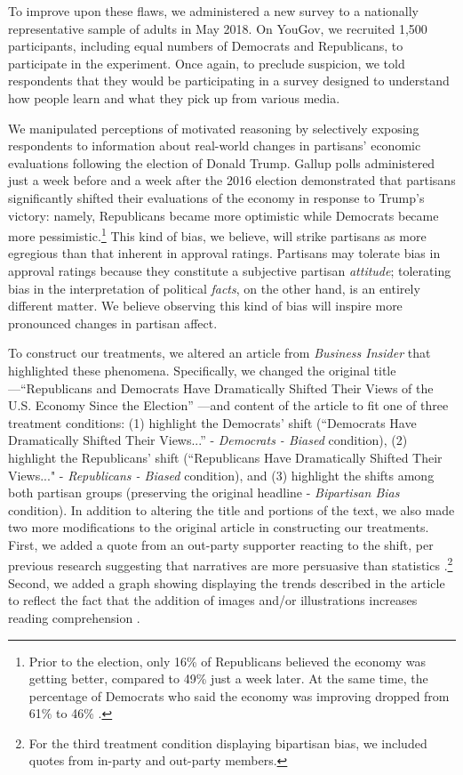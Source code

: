 \documentclass[12pt, letterpaper]{article}
\begin{document}
To improve upon these flaws, we administered a new survey to a nationally representative sample of adults in May 2018. On YouGov, we recruited 1,500 participants, including equal numbers of Democrats and Republicans, to participate in the experiment. Once again, to preclude suspicion, we told respondents that they would be participating in a survey designed to understand how people learn and what they pick up from various media.

We manipulated perceptions of motivated reasoning by selectively exposing respondents to information about real-world changes in partisans' economic evaluations following the election of Donald Trump. Gallup polls administered just a week before and a week after the 2016 election demonstrated that partisans significantly shifted their evaluations of the economy in response to Trump's victory: namely, Republicans became more optimistic while Democrats became more pessimistic.\footnote{Prior to the election, only 16\% of Republicans believed the economy was getting better, compared to 49\% just a week later. At the same time, the percentage of Democrats who said the economy was improving dropped from 61\% to 46\% \citep{gallup_econ}.} This kind of bias, we believe, will strike partisans as more egregious than that inherent in approval ratings. Partisans may tolerate bias in approval ratings because they constitute a subjective partisan \textit{attitude}; tolerating bias in the interpretation of political \textit{facts}, on the other hand, is an entirely different matter. We believe observing this kind of bias will inspire more pronounced changes in partisan affect.

To construct our treatments, we altered an article from \textit{Business Insider} that highlighted these phenomena. Specifically, we changed the original title---``Republicans and Democrats Have Dramatically Shifted Their Views of the U.S. Economy Since the Election'' \citep{bi_2016}---and content of the article to fit one of three treatment conditions: (1) highlight the Democrats' shift (``Democrats Have Dramatically Shifted Their Views...'' - \textit{Democrats - Biased} condition), (2) highlight the Republicans' shift (``Republicans Have Dramatically Shifted Their Views..." - \textit{Republicans - Biased} condition), and (3) highlight the shifts among both partisan groups (preserving the original headline - \textit{Bipartisan Bias} condition). In addition to altering the title and portions of the text, we also made two more modifications to the original article in constructing our treatments. First, we added a quote from an out-party supporter reacting to the shift, per previous research suggesting that narratives are more persuasive than statistics \citep{Kahneman2011}.\footnote{For the third treatment condition displaying bipartisan bias, we included quotes from in-party and out-party members.} Second, we added a graph showing displaying the trends described in the article to reflect the fact that the addition of images and/or illustrations increases reading comprehension \citep{gambrelljawitz_1993}. 
\end{document}
